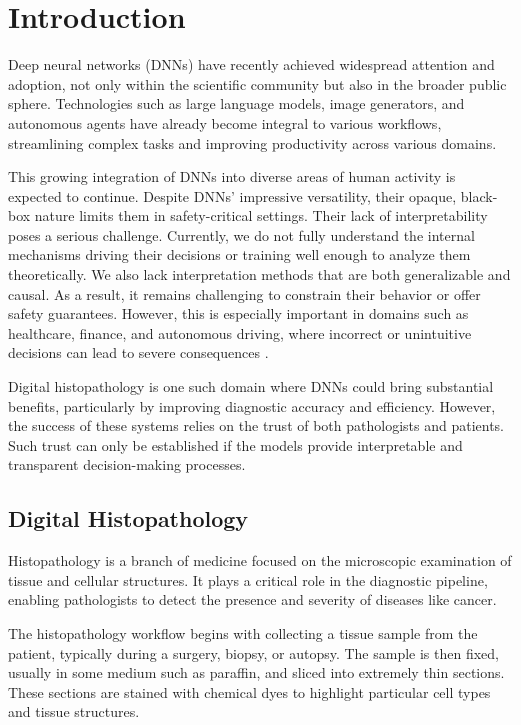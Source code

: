 \chapter{Introduction}

Deep neural networks (DNNs) have recently achieved widespread attention and adoption,
not only within the scientific community but also in the broader public sphere.
Technologies such as large language models, image generators, and autonomous agents
have already become integral to various workflows,
streamlining complex tasks and improving productivity across various domains.

This growing integration of DNNs into diverse areas of human activity is expected to continue.
Despite DNNs' impressive versatility, their opaque, black-box nature limits them in safety-critical settings.
Their lack of interpretability poses a serious challenge. Currently, we do not fully understand the internal mechanisms driving their decisions or training well enough to analyze them theoretically. We also lack interpretation methods that are both generalizable and causal.
As a result, it remains challenging to constrain their behavior or offer safety guarantees. However, this is especially important in domains such as healthcare, finance, and autonomous driving, where incorrect or unintuitive decisions can lead to severe consequences \cite{linardatos2020explainable}.

Digital histopathology is one such domain where DNNs could bring substantial benefits,
particularly by improving diagnostic accuracy and efficiency.
However, the success of these systems relies on the trust of both pathologists and patients.
Such trust can only be established if the models provide interpretable and transparent decision-making processes.


\newpage
\section{Digital Histopathology}

Histopathology is a branch of medicine focused on the microscopic examination of tissue and cellular structures.
It plays a critical role in the diagnostic pipeline, enabling pathologists to detect the presence and severity of diseases like cancer.

The histopathology workflow begins with collecting a tissue sample from the patient,
typically during a surgery, biopsy, or autopsy. The sample is then fixed, usually in some medium such as paraffin,
and sliced into extremely thin sections. These sections are stained with chemical dyes to highlight particular cell types and tissue structures.


